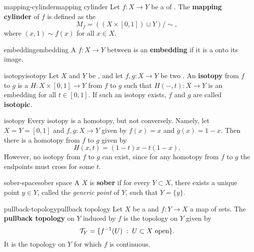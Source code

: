 \begin{topic}{mapping-cylinder}{mapping cylinder}
    Let $f \colon X \to Y$ be a  of . The \textbf{mapping cylinder} of $f$ is defined as the 
    \[ M_f = ( (X \times [0, 1]) \sqcup Y ) / \sim{} , \]
    where $(x, 1) \sim f(x)$ for all $x \in X$.
\end{topic}

\begin{topic}{embedding}{embedding}
    A  $f \colon X \to Y$ between  is an \textbf{embedding} if it is a  onto its image.
\end{topic}

\begin{topic}{isotopy}{isotopy}
    Let $X$ and $Y$ be , and let $f, g \colon X \to Y$ be two . An \textbf{isotopy} from $f$ to $g$ is a  $H \colon X \times [0, 1] \to Y$ from $f$ to $g$ such that $H(-, t) \colon X \to Y$ is an embedding for all $t \in [0, 1]$. If such an isotopy exists, $f$ and $g$ are called \textbf{isotopic}.
\end{topic}

\begin{example}{isotopy}
    Every isotopy is a homotopy, but not conversely. Namely, let $X = Y = [0, 1]$ and $f, g \colon X \to Y$ given by $f(x) = x$ and $g(x) = 1 - x$. Then there is a homotopy from $f$ to $g$ given by
    \[ H(x, t) = (1 - t) x - t (1 - x) . \]
    However, no isotopy from $f$ to $g$ can exist, since for any homotopy from $f$ to $g$ the endpoints must cross for some $t$.
\end{example}

\begin{topic}{sober-space}{sober space}
    A  $X$ is \textbf{sober} if for every  $Y \subset X$, there exists a unique point $y \in Y$, called the \textit{generic point} of $Y$, such that $Y = \overline{\{ y \}}$.
\end{topic}

\begin{topic}{pullback-topology}{pullback topology}
    Let $X$ be a  and $f \colon Y \to X$ a map of sets. The \textbf{pullback topology} on $Y$ induced by $f$ is the topology on $Y$ given by
    \[ \mathcal{T}_Y = \{ f^{-1}(U) \;:\; U \subset X \textup{ open} \} . \]
    It is the  topology on $Y$ for which $f$ is continuous.
\end{topic}

